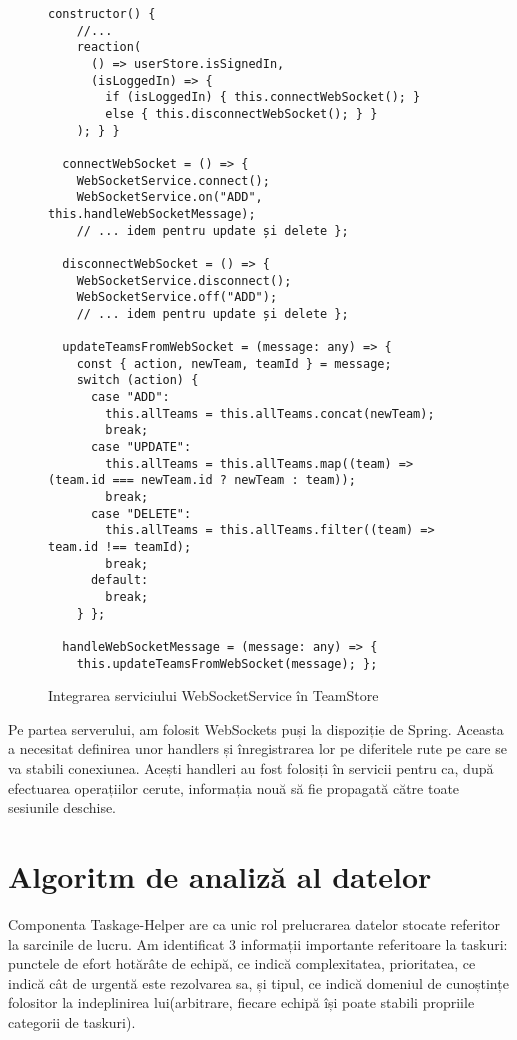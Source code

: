 \begin{figure}[H]
	\begin{lstlisting}[frame=single, style=java]
  constructor() {
	//...
    reaction(
      () => userStore.isSignedIn,
      (isLoggedIn) => {
        if (isLoggedIn) { this.connectWebSocket(); }
        else { this.disconnectWebSocket(); } }
    ); } }

  connectWebSocket = () => {
    WebSocketService.connect();
    WebSocketService.on("ADD", this.handleWebSocketMessage);
    // ... idem pentru update și delete };

  disconnectWebSocket = () => {
    WebSocketService.disconnect();
    WebSocketService.off("ADD");
    // ... idem pentru update și delete };

  updateTeamsFromWebSocket = (message: any) => {
    const { action, newTeam, teamId } = message;
    switch (action) {
      case "ADD":
        this.allTeams = this.allTeams.concat(newTeam);
        break;
      case "UPDATE":
        this.allTeams = this.allTeams.map((team) => (team.id === newTeam.id ? newTeam : team));
        break;
      case "DELETE":
        this.allTeams = this.allTeams.filter((team) => team.id !== teamId);
        break;
      default:
        break;
    } };

  handleWebSocketMessage = (message: any) => {
    this.updateTeamsFromWebSocket(message); };
	\end{lstlisting}
	\label{websocket-reaction}
	\caption{ Integrarea serviciului WebSocketService în TeamStore }
\end{figure}

Pe partea serverului, am folosit WebSockets puși la dispoziție de Spring. Aceasta a necesitat definirea unor handlers și înregistrarea lor pe diferitele rute pe care se va stabili conexiunea. Acești handleri au fost folosiți în servicii pentru ca, după efectuarea operațiilor cerute, informația nouă să fie propagată către toate sesiunile deschise.

\section{Algoritm de analiză al datelor}

Componenta Taskage-Helper are ca unic rol prelucrarea datelor stocate referitor la sarcinile de lucru. Am identificat 3 informații importante referitoare la taskuri: punctele de efort hotărâte de echipă, ce indică complexitatea, prioritatea, ce indică cât de urgentă este rezolvarea sa, și tipul, ce indică domeniul de cunoștințe folositor la indeplinirea lui(arbitrare, fiecare echipă își poate stabili propriile categorii de taskuri).

